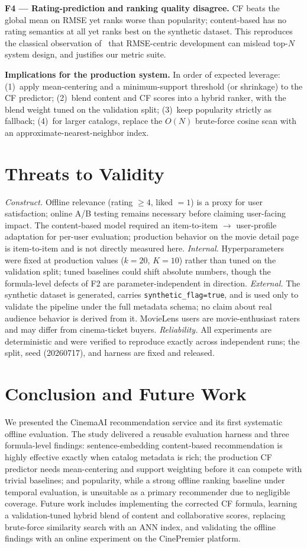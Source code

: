 \documentclass[conference]{IEEEtran}
\begin{document}
\textbf{F4 --- Rating-prediction and ranking quality disagree.} CF beats the
global mean on RMSE yet ranks worse than popularity; content-based has no
rating semantics at all yet ranks best on the synthetic dataset. This
reproduces the classical observation of~\cite{cremonesi2010performance} that
RMSE-centric development can mislead top-$N$ system design, and justifies our
metric suite.

\textbf{Implications for the production system.} In order of expected
leverage: (1)~apply mean-centering and a minimum-support threshold (or
shrinkage) to the CF predictor; (2)~blend content and CF scores into a hybrid
ranker, with the blend weight tuned on the validation split; (3)~keep
popularity strictly as fallback; (4)~for larger catalogs, replace the $O(N)$
brute-force cosine scan with an approximate-nearest-neighbor index.

\section{Threats to Validity}
\emph{Construct.} Offline relevance (rating $\ge 4$, liked $=1$) is a proxy
for user satisfaction; online A/B testing remains necessary before claiming
user-facing impact. The content-based model required an item-to-item
$\rightarrow$ user-profile adaptation for per-user evaluation; production
behavior on the movie detail page is item-to-item and is not directly measured
here. \emph{Internal.} Hyperparameters were fixed at production values
($k=20$, $K=10$) rather than tuned on the validation split; tuned baselines
could shift absolute numbers, though the formula-level defects of F2 are
parameter-independent in direction. \emph{External.} The synthetic dataset is
generated, carries \texttt{synthetic\_flag=true}, and is used only to validate
the pipeline under the full metadata schema; no claim about real audience
behavior is derived from it. MovieLens users are movie-enthusiast raters and
may differ from cinema-ticket buyers. \emph{Reliability.} All experiments are
deterministic and were verified to reproduce exactly across independent runs;
the split, seed (20260717), and harness are fixed and released.

\section{Conclusion and Future Work}
We presented the CinemaAI recommendation service and its first systematic
offline evaluation. The study delivered a reusable evaluation harness and three
formula-level findings: sentence-embedding content-based recommendation is
highly effective exactly when catalog metadata is rich; the production CF
predictor needs mean-centering and support weighting before it can compete
with trivial baselines; and popularity, while a strong offline ranking baseline
under temporal evaluation, is unsuitable as a primary recommender due to
negligible coverage. Future work includes implementing the corrected CF
formula, learning a validation-tuned hybrid blend of content and collaborative
scores, replacing brute-force similarity search with an ANN index, and
validating the offline findings with an online experiment on the CinePremier
platform.
\end{document}
